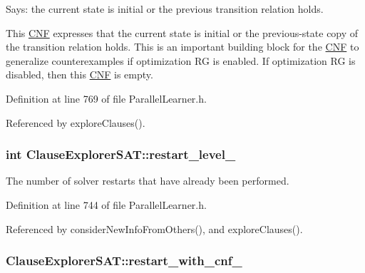 Says\-: the current state is initial or the previous transition relation holds. 

This \hyperlink{classCNF}{C\-N\-F} expresses that the current state is initial or the previous-\/state copy of the transition relation holds. This is an important building block for the \hyperlink{classCNF}{C\-N\-F} to generalize counterexamples if optimization R\-G is enabled. If optimization R\-G is disabled, then this \hyperlink{classCNF}{C\-N\-F} is empty. 

Definition at line 769 of file Parallel\-Learner.\-h.



Referenced by explore\-Clauses().

\hypertarget{classClauseExplorerSAT_a0b5d716111026dd1cb4efe5855e2fe2f}{
\subsubsection[{restart\-\_\-level\-\_\-}]{\setlength{\rightskip}{0pt plus 5cm}int Clause\-Explorer\-S\-A\-T\-::restart\-\_\-level\-\_\-\hspace{0.3cm}{\ttfamily [protected]}}}\label{classClauseExplorerSAT_a0b5d716111026dd1cb4efe5855e2fe2f}


The number of solver restarts that have already been performed. 



Definition at line 744 of file Parallel\-Learner.\-h.



Referenced by consider\-New\-Info\-From\-Others(), and explore\-Clauses().

\hypertarget{classClauseExplorerSAT_a1a9dc7f76967c8164e9625df34dec172}{
\subsubsection[{restart\-\_\-with\-\_\-cnf\-\_\-}]{ Clause\-Explorer\-S\-A\-T\-::restart\-\_\-with\-\_\-cnf\-\_\-\hspace{0.3cm}{\ttfamily [protected]}}}\label{classClauseExplorerSAT_a1a9dc7f76967c8164e9625df34dec172}


